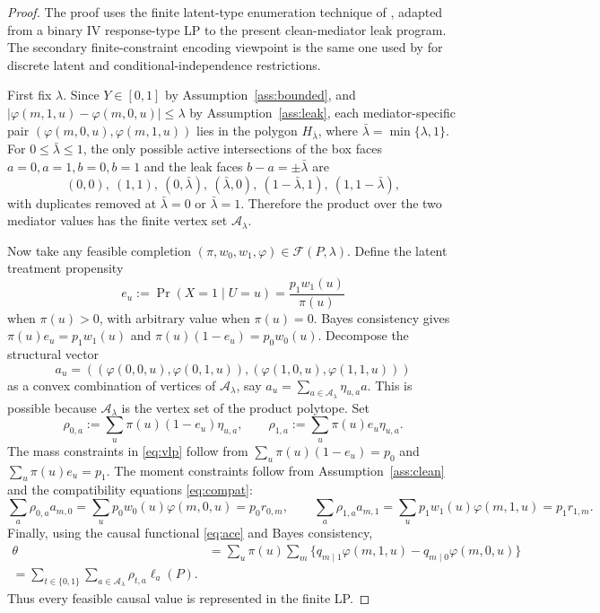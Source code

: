 \begin{proof}
The proof uses the finite latent-type enumeration technique of \citet{BalkePearl1997Bounds}, adapted from a
binary IV response-type LP to the present clean-mediator leak program. The secondary finite-constraint encoding
viewpoint is the same one used by \citet{FinkelsteinAdamsSariaShpitser2020MeasurementError} for discrete latent
and conditional-independence restrictions.

First fix \(\lambda\). Since \(Y\in[0,1]\) by Assumption~\ref{ass:bounded}, and
\(|\varphi(m,1,u)-\varphi(m,0,u)|\le\lambda\) by Assumption~\ref{ass:leak}, each mediator-specific pair
\((\varphi(m,0,u),\varphi(m,1,u))\) lies in the polygon \(H_{\bar\lambda}\), where
\(\bar\lambda=\min\{\lambda,1\}\). For \(0\le\bar\lambda\le1\), the only possible active intersections of the
box faces \(a=0,a=1,b=0,b=1\) and the leak faces \(b-a=\pm\bar\lambda\) are
\[
  (0,0),\ (1,1),\ (0,\bar\lambda),\ (\bar\lambda,0),\ (1-\bar\lambda,1),\ (1,1-\bar\lambda),
\]
with duplicates removed at \(\bar\lambda=0\) or \(\bar\lambda=1\). Therefore the product over the two mediator
values has the finite vertex set \(\mathcal A_\lambda\).

Now take any feasible completion
\((\pi,w_0,w_1,\varphi)\in\mathcal F(P,\lambda)\). Define the latent treatment propensity
\[
  e_u:=\Pr(X=1\mid U=u)=\frac{p_1w_1(u)}{\pi(u)}
\]
when \(\pi(u)>0\), with arbitrary value when \(\pi(u)=0\). Bayes consistency gives
\(\pi(u)e_u=p_1w_1(u)\) and \(\pi(u)(1-e_u)=p_0w_0(u)\). Decompose the structural vector
\[
  a_u=((\varphi(0,0,u),\varphi(0,1,u)),(\varphi(1,0,u),\varphi(1,1,u)))
\]
as a convex combination of vertices of \(\mathcal A_\lambda\), say
\(a_u=\sum_{a\in\mathcal A_\lambda}\eta_{u,a}a\). This is possible because
\(\mathcal A_\lambda\) is the vertex set of the product polytope. Set
\[
  \rho_{0,a}:=\sum_u\pi(u)(1-e_u)\eta_{u,a},\qquad
  \rho_{1,a}:=\sum_u\pi(u)e_u\eta_{u,a}.
\]
The mass constraints in \eqref{eq:vlp} follow from
\(\sum_u\pi(u)(1-e_u)=p_0\) and \(\sum_u\pi(u)e_u=p_1\). The moment constraints follow from
Assumption~\ref{ass:clean} and the compatibility equations \eqref{eq:compat}:
\[
  \sum_a\rho_{0,a}a_{m,0}
  =\sum_u p_0w_0(u)\varphi(m,0,u)=p_0r_{0,m},
  \qquad
  \sum_a\rho_{1,a}a_{m,1}
  =\sum_u p_1w_1(u)\varphi(m,1,u)=p_1r_{1,m}.
\]
Finally, using the causal functional \eqref{eq:ace} and Bayes consistency,
\[
\begin{aligned}
  \theta
  &=\sum_u\pi(u)\sum_m\{q_{m\mid1}\varphi(m,1,u)-q_{m\mid0}\varphi(m,0,u)\}\\
  =\sum_{t\in\{0,1\}}\sum_{a\in\mathcal A_\lambda}\rho_{t,a}\ell_a(P).
\end{aligned}
\]
Thus every feasible causal value is represented in the finite LP.


\end{proof}
